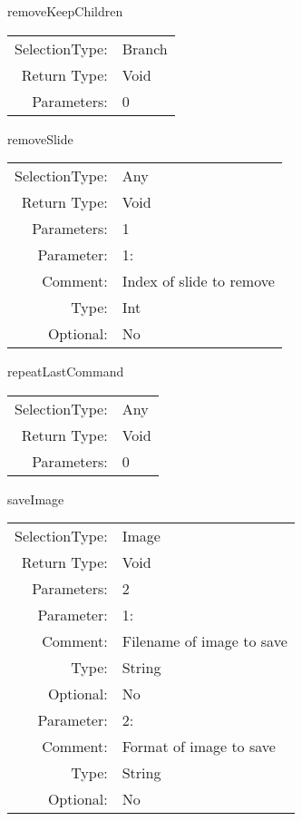 \item removeKeepChildren\\
\begin{tabular}{rl}
  SelectionType: & Branch\\
    Return Type: & Void\\
     Parameters: & 0\\
\end{tabular}

\item removeSlide\\
\begin{tabular}{rl}
  SelectionType: & Any\\
    Return Type: & Void\\
     Parameters: & 1\\
   Parameter: &  1:\\
        Comment: & Index of slide to remove\\
           Type: & Int\\
       Optional: &  No\\
\end{tabular}

\item repeatLastCommand\\
\begin{tabular}{rl}
  SelectionType: & Any\\
    Return Type: & Void\\
     Parameters: & 0\\
\end{tabular}

\item saveImage\\
\begin{tabular}{rl}
  SelectionType: & Image\\
    Return Type: & Void\\
     Parameters: & 2\\
   Parameter: &  1:\\
        Comment: & Filename of image to save\\
           Type: & String\\
       Optional: &  No\\
   Parameter: &  2:\\
        Comment: & Format of image to save\\
           Type: & String\\
       Optional: &  No\\
\end{tabular}

